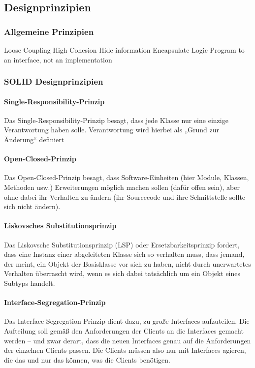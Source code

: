 \subsection{Designprinzipien}

\subsubsection{Allgemeine Prinzipien}
Loose Coupling
High Cohesion
Hide information
Encapsulate Logic
Program to an interface, not an implementation

\subsubsection{SOLID Designprinzipien}

\paragraph{Single-Responsibility-Prinzip}
Das Single-Responsibility-Prinzip besagt, dass jede Klasse nur eine einzige Verantwortung haben solle. Verantwortung wird hierbei als „Grund zur Änderung“ definiert

\paragraph{Open-Closed-Prinzip}
Das Open-Closed-Prinzip besagt, dass Software-Einheiten (hier Module, Klassen, Methoden usw.) Erweiterungen möglich machen sollen (dafür offen sein), aber ohne dabei ihr Verhalten zu ändern (ihr Sourcecode und ihre Schnittstelle sollte sich nicht ändern).

\paragraph{Liskovsches Substitutionsprinzip}
Das Liskovsche Substitutionsprinzip (LSP) oder Ersetzbarkeitsprinzip fordert, dass eine Instanz einer abgeleiteten Klasse sich so verhalten muss, dass jemand, der meint, ein Objekt der Basisklasse vor sich zu haben, nicht durch unerwartetes Verhalten überrascht wird, wenn es sich dabei tatsächlich um ein Objekt eines Subtyps handelt.

\paragraph{Interface-Segregation-Prinzip}
Das Interface-Segregation-Prinzip dient dazu, zu große Interfaces aufzuteilen. Die Aufteilung soll gemäß den Anforderungen der Clients an die Interfaces gemacht werden – und zwar derart, dass die neuen Interfaces genau auf die Anforderungen der einzelnen Clients passen. Die Clients müssen also nur mit Interfaces agieren, die das und nur das können, was die Clients benötigen.

